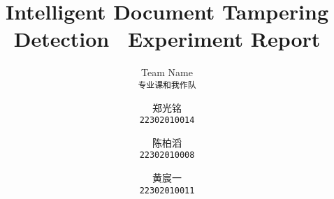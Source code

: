 \documentclass[10pt,twocolumn,letterpaper]{article}
\title{Intelligent Document Tampering Detection \confName~Experiment Report}
\author{Team Name\\
{\tt\small 专业课和我作队}
\and
郑光铭\\
{\tt\small 22302010014}
\and
陈柏滔\\
{\tt\small 22302010008}
\and
黄宸一\\
{\tt\small 22302010011}
}
\begin{document}
\maketitle






{
    \small
    
    
}

% 
\end{document}
